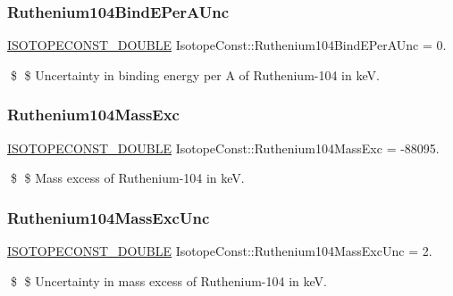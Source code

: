 \subsubsection{\texorpdfstring{Ruthenium104\+Bind\+E\+Per\+A\+Unc}{Ruthenium104BindEPerAUnc}}
{\footnotesize\ttfamily \mbox{\hyperlink{group___isotope_const-_macros_ga8f45a7272ce02c0b4c65c44636ed719a}{I\+S\+O\+T\+O\+P\+E\+C\+O\+N\+S\+T\+\_\+\+D\+O\+U\+B\+LE}} Isotope\+Const\+::\+Ruthenium104\+Bind\+E\+Per\+A\+Unc = 0.}

\$ \$ Uncertainty in binding energy per A of Ruthenium-\/104 in keV. \mbox{\label{group___isotope_const-_ruthenium-_ru104_ga5640dce6df083ca30ce2f1fa25010c27}} 
\subsubsection{\texorpdfstring{Ruthenium104\+Mass\+Exc}{Ruthenium104MassExc}}
{\footnotesize\ttfamily \mbox{\hyperlink{group___isotope_const-_macros_ga8f45a7272ce02c0b4c65c44636ed719a}{I\+S\+O\+T\+O\+P\+E\+C\+O\+N\+S\+T\+\_\+\+D\+O\+U\+B\+LE}} Isotope\+Const\+::\+Ruthenium104\+Mass\+Exc = -\/88095.}

\$ \$ Mass excess of Ruthenium-\/104 in keV. \mbox{\label{group___isotope_const-_ruthenium-_ru104_ga5da6a0821c9875a582522159d195929f}} 
\subsubsection{\texorpdfstring{Ruthenium104\+Mass\+Exc\+Unc}{Ruthenium104MassExcUnc}}
{\footnotesize\ttfamily \mbox{\hyperlink{group___isotope_const-_macros_ga8f45a7272ce02c0b4c65c44636ed719a}{I\+S\+O\+T\+O\+P\+E\+C\+O\+N\+S\+T\+\_\+\+D\+O\+U\+B\+LE}} Isotope\+Const\+::\+Ruthenium104\+Mass\+Exc\+Unc = 2.}

\$ \$ Uncertainty in mass excess of Ruthenium-\/104 in keV. \mbox{\label{group___isotope_const-_ruthenium-_ru104_ga290d6c23257a478cd0587c20491e41c3}} 

